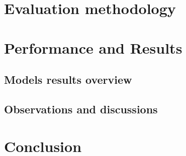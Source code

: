 \documentclass[energies,article,accept,pdftex,moreauthors]{Definitions/mdpi}
\begin{document}
\section{Evaluation methodology} \label{sec:Meth}

    
    
    
    
\section{Performance and Results}\label{sec:results}

    \subsection{Models results overview}
    
     
    
    \subsection{Observations and discussions}
    
\section{Conclusion} \label{sec:conclussion}


\vspace{6pt} 

\end{document}
